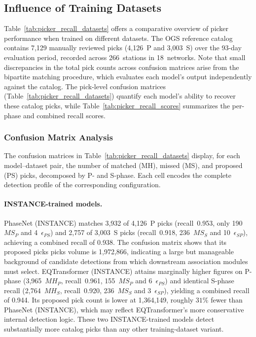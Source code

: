 \subsection{Influence of Training Datasets}
Table~\ref{tab:picker_recall_datasets} offers a comparative overview of
picker performance when trained on different datasets. The OGS reference
catalog contains 7,129 manually reviewed picks (4,126~P and 3,003~S) over the
93-day evaluation period, recorded across 266~stations in 18~networks. Note
that small discrepancies in the total pick counts across confusion matrices
arise from the bipartite matching procedure, which evaluates each model's
output independently against the catalog. The pick-level confusion matrices
(Table~\ref{tab:picker_recall_datasets}) quantify each model's ability to
recover these catalog picks, while Table~\ref{tab:picker_recall_scores}
summarizes the per-phase and combined recall scores.

\subsubsection{Confusion Matrix Analysis}
The confusion matrices in Table~\ref{tab:picker_recall_datasets} display, for
each model--dataset pair, the number of matched (MH), missed (MS), and proposed
(PS) picks, decomposed by P- and S-phase. Each cell encodes the complete
detection profile of the corresponding configuration.

\paragraph{INSTANCE-trained models.}
PhaseNet (INSTANCE) matches 3,932 of 4,126~P picks (recall~0.953, only
190~$MS_P$ and 4~$\epsilon_{PS}$) and 2,757 of 3,003~S picks (recall~0.918,
236~$MS_S$ and 10~$\epsilon_{SP}$), achieving a combined recall of 0.938. The
confusion matrix shows that its proposed picks picks volume is 1,972,866,
indicating a large but manageable background of candidate detections from which
downstream association modules must select. EQTransformer (INSTANCE) attains
marginally higher figures on P-phase (3,965~$MH_P$, recall~0.961, 155~$MS_P$
and 6~$\epsilon_{PS}$) and identical S-phase recall (2,764~$MH_S$,
recall~0.920, 236~$MS_S$ and 3~$\epsilon_{SP}$), yielding a combined recall of
0.944. Its proposed pick count is lower at 1,364,149, roughly $31\%$ fewer than
PhaseNet (INSTANCE), which may reflect EQTransformer's more conservative
internal detection logic. These two INSTANCE-trained models detect
substantially more catalog picks than any other training-dataset variant.

